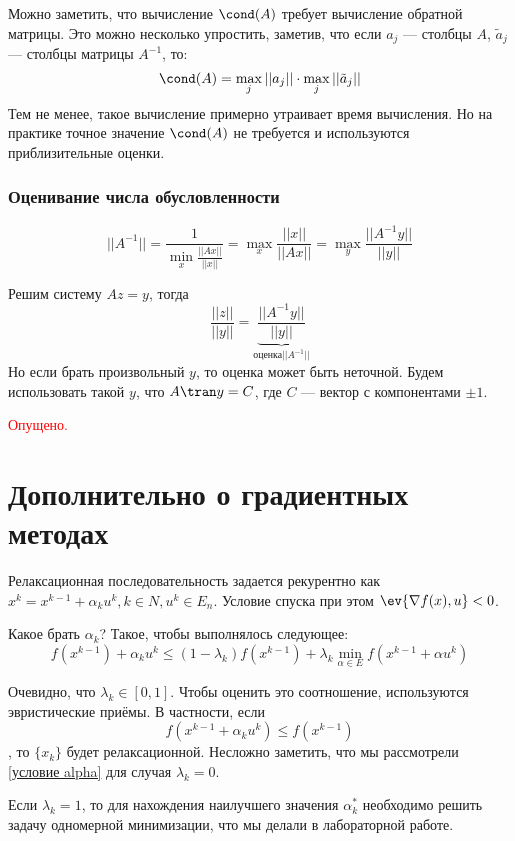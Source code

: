 Можно заметить, что вычисление \(\cond(A)\) требует вычисление обратной матрицы. Это можно несколько упростить, заметив, что если \(a_j\) --- столбцы \(A\), \(\tilde{a}_j\) --- столбцы матрицы \(A^{ - 1}\), то:
\[\cond(A) = \max_j ||a_j|| \cdot \max_j ||\tilde{a}_j||\]
Тем не менее, такое вычисление примерно утраивает время вычисления. Но на практике точное значение \(\cond(A)\) не требуется и используются приблизительные оценки.

\subsubsection{Оценивание числа обусловленности}

\[||A^{ - 1}|| = \frac{1}{\min_x \frac{||Ax||}{||x||}} = \max_x \frac{||x||}{||Ax||} = \max_y \frac{||A^{ - 1}y||}{||y||}\]

Решим систему \(Az = y\), тогда
\[\frac{||z||}{||y||} = \underbrace{\frac{||A^{ - 1}y||}{||y||}}_{\text{оценка} ||A^{-1}||}\]
Но если брать произвольный \(y\), то оценка может быть неточной. Будем использовать такой \(y\), что \(A\tran y = C\), где \(C \) --- вектор с компонентами \( \pm 1\).

\begin{example}
    \textcolor{red}{Опущено.}
\end{example}

\section{Дополнительно о градиентных методах}

Релаксационная последовательность задается рекурентно как \(x^k = x^{k - 1} + \alpha_k u^k, k \in N, u^k \in E_n\). Условие спуска при этом \(\ev{\nabla f(x), u} < 0\).

Какое брать \(\alpha_k\)? Такое, чтобы выполнялось следующее:
\begin{equation}
    f(x^{k - 1}) + \alpha_k u^k \leq (1 - \lambda_k) f(x^{k - 1}) + \lambda_k \min_{\alpha \in E} f(x^{k - 1} + \alpha u^k)
    \label{условие alpha}
\end{equation}

Очевидно, что \(\lambda_k \in [0, 1]\). Чтобы оценить это соотношение, используются эвристические приёмы. В частности, если
\[f(x^{k - 1} + \alpha_k u^k) \leq f(x^{k - 1})\]
, то \(\{x_k\}\) будет релаксационной. Несложно заметить, что мы рассмотрели \eqref{условие alpha} для случая \(\lambda_k = 0\).

Если \(\lambda_k = 1\), то для нахождения наилучшего значения \(\alpha_k^*\) необходимо решить задачу одномерной минимизации, что мы делали в лабораторной работе.

